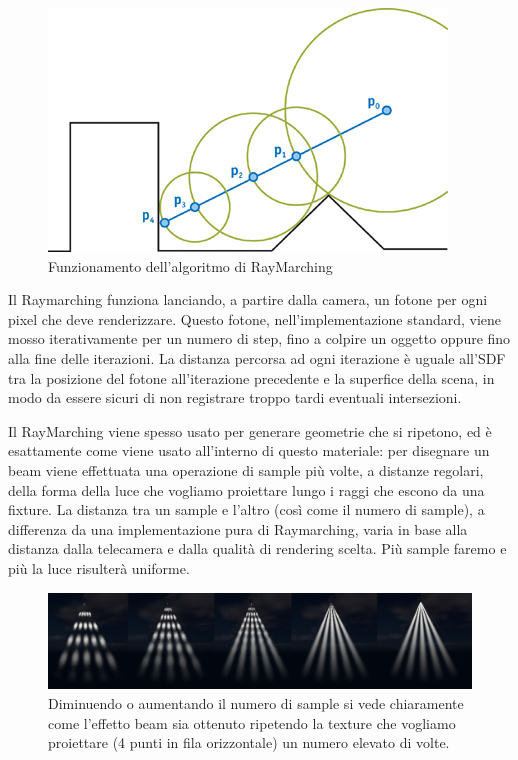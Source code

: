 \documentclass[main.tex]{subfiles}
\begin{document}
\begin{figure}
    \centering
    \captionsetup{justification=centering}
    \includegraphics[scale=0.65]{img/renderingPipeline/spheretrace.jpg}
    \caption{Funzionamento dell'algoritmo di RayMarching}
    \label{fig:2_raymarchWikipedia} %
\end{figure}
Il Raymarching funziona lanciando, a partire dalla camera, un fotone per ogni pixel che deve renderizzare. Questo fotone, nell'implementazione standard, viene mosso iterativamente per un numero di step, fino a colpire un oggetto oppure fino alla fine delle iterazioni. La distanza percorsa ad ogni iterazione è uguale all'SDF tra la posizione del fotone all'iterazione precedente e la superfice della scena, in modo da essere sicuri di non registrare troppo tardi eventuali intersezioni.\newline

Il RayMarching viene spesso usato per generare geometrie che si ripetono, ed è esattamente come viene usato all'interno di questo materiale: per disegnare un beam viene effettuata una operazione di sample più volte, a distanze regolari, della forma della luce che vogliamo proiettare lungo i raggi che escono da una fixture. La distanza tra un sample e l'altro (così come il numero di sample), a differenza da una implementazione pura di Raymarching, varia in base alla distanza dalla telecamera e dalla qualità di rendering scelta. Più sample faremo e più la luce risulterà uniforme. 
\begin{figure}[H]
    \centering
    \includegraphics[width=1\linewidth]{img/renderingPipeline/renderingQuality.jpg}
    \caption{Diminuendo o aumentando il numero di sample si vede chiaramente come l'effetto beam sia ottenuto ripetendo la texture che vogliamo proiettare (4 punti in fila orizzontale) un numero elevato di volte.}
    \label{fig:2_raymarchQualities}
\end{figure}
\end{document}
